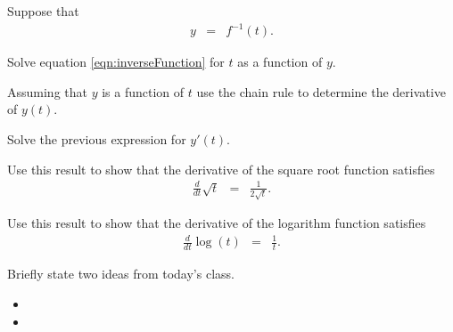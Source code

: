 \begin{problem}
\item Suppose that
  \begin{eqnarray}
    \label{eqn:inverseFunction}
    y &= & f^{-1}(t).
  \end{eqnarray}
  \begin{subproblem}
    \item Solve equation \ref{eqn:inverseFunction} for $t$ as a
      function of $y$.
      \vfill

    \item Assuming that $y$ is a function of $t$ use the chain rule to
      determine the derivative of $y(t)$.
      \vfill

    \item Solve the previous expression for $y'(t)$.
      \vfill

  \end{subproblem}

  \clearpage

\item Use this result to show that the derivative of the square root
  function satisfies
  \begin{eqnarray*}
    \frac{d}{dt} \sqrt{t} & = & \frac{1}{2\sqrt{t}}.
  \end{eqnarray*}

  \vfill

  \clearpage

\item Use this result to show that the derivative of the logarithm
  function satisfies
  \begin{eqnarray*}
    \frac{d}{dt} \log(t) & = & \frac{1}{t}.
  \end{eqnarray*}

  \vfill


\end{problem}

\postClass

\begin{problem}
\item Briefly state two ideas from today's class.
  \begin{itemize}
  \item 
  \item 
  \end{itemize}
\item 
  \begin{subproblem}
    \item
  \end{subproblem}
\end{problem}




